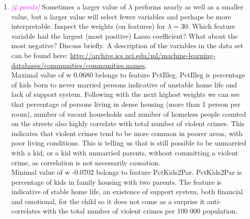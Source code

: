 \documentclass{article}
\newcommand{\1}{\mathbf{1}}
\newcommand{\points}[1]{\small\textcolor{magenta}{\emph{[#1 points]}} \normalsize}
\begin{document}
\begin{enumerate}
    \newpage
    \item \points{4} Sometimes a larger value of $\lambda$ performs nearly as well as a smaller value, but a larger value will select fewer variables and perhaps be more interpretable. Inspect the weights (on features) for $\lambda = 30$. Which feature variable had the largest (most positive) Lasso coefficient? What about the most negative? Discuss briefly. A description of the variables in the data set can be found here: \url{http://archive.ics.uci.edu/ml/machine-learning-databases/communities/communities.names}. \\
    
    Maximal value of w 0.0680 belongs to feature PctIlleg. PctIlleg is percentage of kids born to never married persons indicative of unstable home life and lack of support system. Following with the next highest weights we can see that percentage of persons living in dense housing (more than 1 person per room), number of vacant households and number of homeless people counted on the streets also highly correlate with total number of violent crimes. This indicates that violent crimes tend to be more common in poorer areas, with poor living conditions. This is telling us that is still possible to be unmarried with a kid, or a kid with unmarried parents, without committing a violent crime, as correlation is not necessarily causation.  \\
    Minimal value of w -0.0702 belongs to feature PctKids2Par. PctKids2Par is percentage of kids in family housing with two parents. The feature is indicative of stable home life, an existence of support system, both financial and emotional, for the child so it does not come as a surprise it anti-correlates with the total number of violent crimes per 100 000 population. 


\end{enumerate}
\end{document}
